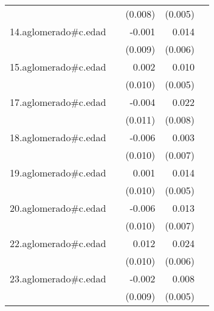 {\begin{longtable}{l*{4}{D{.}{.}{-1}}}
            &                     &     (0.008)         &     (0.005)         &                     \\
\addlinespace
14.aglomerado#c.edad&                     &      -0.001         &       0.014\sym{*}  &                     \\
            &                     &     (0.009)         &     (0.006)         &                     \\
\addlinespace
15.aglomerado#c.edad&                     &       0.002         &       0.010         &                     \\
            &                     &     (0.010)         &     (0.005)         &                     \\
\addlinespace
17.aglomerado#c.edad&                     &      -0.004         &       0.022\sym{**} &                     \\
            &                     &     (0.011)         &     (0.008)         &                     \\
\addlinespace
18.aglomerado#c.edad&                     &      -0.006         &       0.003         &                     \\
            &                     &     (0.010)         &     (0.007)         &                     \\
\addlinespace
19.aglomerado#c.edad&                     &       0.001         &       0.014\sym{**} &                     \\
            &                     &     (0.010)         &     (0.005)         &                     \\
\addlinespace
20.aglomerado#c.edad&                     &      -0.006         &       0.013         &                     \\
            &                     &     (0.010)         &     (0.007)         &                     \\
\addlinespace
22.aglomerado#c.edad&                     &       0.012         &       0.024\sym{***}&                     \\
            &                     &     (0.010)         &     (0.006)         &                     \\
\addlinespace
23.aglomerado#c.edad&                     &      -0.002         &       0.008         &                     \\
            &                     &     (0.009)         &     (0.005)         &                     \\

\end{longtable}}
